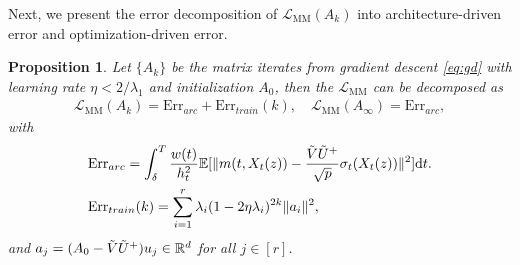 \documentclass[11pt]{article}
\newcommand{\mb}{\mathbb}
\newcommand{\dee}{\mathrm{d}}
\newcommand{\mc}{\mathcal}
\newcommand{\MM}{\mc{L}_{\mathrm{MM}}}
\newcommand{\Err}{\mathrm{Err}}
\newtheorem{proposition}{Proposition}[section]
\begin{document}
Next, we present the error decomposition of $\MM(A_k)$ into architecture-driven error and optimization-driven error.
\begin{proposition}\label{prop:MM decomposition} Let $\{A_k\}$ be the matrix iterates from gradient descent \eqref{eq:gd} with learning rate $\eta<2/\lambda_1$ and initialization $A_0$, then the $\MM$ can be decomposed as
    \begin{align*}
        \MM(A_k) = \Err_{arc} + \Err_{train}(k), \quad  \MM(A_\infty) = \Err_{arc},
    \end{align*}
with 
\begin{align*}
    & \Err_{arc} = \int_\delta^T \frac{w(t)}{h_t^2}\mb{E}[  \| m(t,X_t(z))-\frac{\Tilde{V}\Tilde{U}^+}{\sqrt{p}}\sigma_t(X_t(z))  \|^2 ] \dee t.\\
    & \Err_{train}(k) = \sum_{i=1}^r \lambda_i (1-2\eta \lambda_i)^{2k}\| a_i \|^2,
\end{align*}
and $a_j=(A_0-\Tilde{V}\Tilde{U}^+)u_j\in \mb{R}^d$ for all $j\in [r]$.
\end{proposition}
\end{document}
